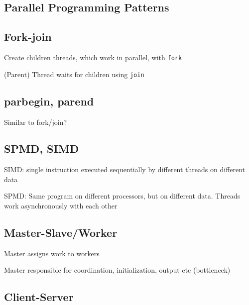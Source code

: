 \documentclass[12pt]{article}
\begin{document}
\begin{spacing}{1.5}
\section{Parallel Programming Patterns}

\subsection{Fork-join}

\begin{itemize*}
	\item Create children threads, which work in parallel, with \texttt{fork}
	\item (Parent) Thread waits for children using \texttt{join} 
\end{itemize*}

\subsection{parbegin, parend}

\begin{itemize*}
	\item Similar to fork/join?
\end{itemize*}

\subsection{SPMD, SIMD}

\begin{itemize*}
	\item SIMD: single instruction executed sequentially by different threads on different data
	\item SPMD: Same program on different processors, but on different data. Threads work asynchronously with each other
\end{itemize*}

\subsection{Master-Slave/Worker}

\begin{itemize*}
	\item Master assigns work to workers
	\item Master responsible for coordination, initialization, output etc (bottleneck)
\end{itemize*}

\subsection{Client-Server}


\end{spacing}
\end{document}
